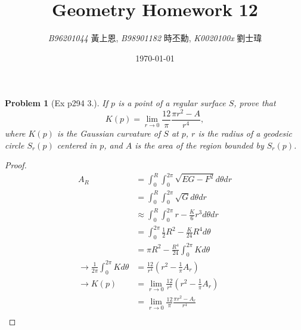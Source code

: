 \documentclass[10pt,a4paper]{article}
\newcommand{\LiHei}{\CJKfamily{lh}}
\newcounter{theProblemCounter}
\newtheorem{problem}[theProblemCounter]{Problem}
\begin{document}
\title{{Geometry Homework 12}}
\author{{\it{B96201044}} {\LiHei 黃上恩}, {\it{B98901182}} {\LiHei 時丕勳}, {\it{K0020100x}} {\LiHei 劉士瑋}}
\date{\today}
\maketitle

\newcommand{\bx}{\mathbb{X}}
\newcommand{\bfx}{\mathbf{x}}
\newcommand{\grad}{\textrm{grad }}
\newcommand{\sech}{\mbox{sech}}
\newcommand{\pr}[2]{\frac{\partial #1}{\partial #2}}
\newcommand{\prr}[3]{\frac{\partial^2 #1}{\partial #2\partial #3}}
\newcommand{\ip}[2]{\left\langle#1, #2\right\rangle}

\setcounter{theProblemCounter}{2}
\begin{problem}[Ex p294 3.]
If $p$ is a point of a regular surface $S$, prove that \[ K(p) = \lim_{r\to 0}\frac{12}{\pi}\frac{\pi r^2-A}{r^4}, \] where $K(p)$ is the Gaussian curvature of $S$ at $p$, $r$ is the radius of a geodesic circle $S_r(p)$ centered in $p$, and $A$ is the area of the region bounded by $S_r(p)$.
\end{problem}
\begin{proof}
\begin{align*}
A_R&=\int_{0}^{R}\int_0^{2\pi}\sqrt{EG-F^2}d\theta dr\\
&=\int_{0}^{R}\int_0^{2\pi}\sqrt{G}d\theta dr\\
&\approx \int_{0}^{R}\int_0^{2\pi} r-\frac{K}{6}r^3 d\theta dr\\
&=\int_0^{2\pi}\frac{1}{2}R^2-\frac{K}{24}R^4 d\theta\\
&=\pi R^2-\frac{R^4}{24}\int_0^{2\pi}K d\theta\\
\rightarrow \frac{1}{2\pi}\int_0^{2\pi}K d\theta &=\frac{12}{r^4}(r^2-\frac{1}{\pi}A_r)\\
\rightarrow K(p)&=\lim_{r\to 0}\frac{12}{r^4}(r^2-\frac{1}{\pi}A_r)\\
&=\lim_{r\to 0}\frac{12}{\pi}\frac{\pi r^2-A_r}{r^4}\\
\end{align*}
\end{proof}
\end{document}

